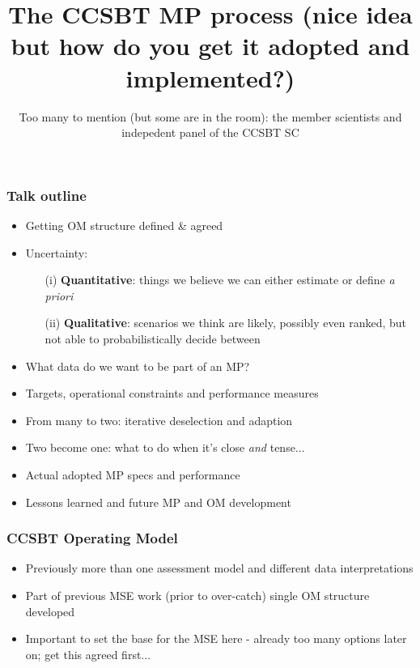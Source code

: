 \documentclass{beamer}
\title{The CCSBT MP process (nice idea but how do you get it adopted and implemented?)}
\author{Too many to mention (but some are in the room): the member scientists and indepedent panel of the CCSBT SC}
\begin{document}
\maketitle
\begin{frame}
\frametitle{Talk outline}
\begin{itemize}
    \item Getting OM structure defined \& agreed
    \item Uncertainty:
        \begin{enumerate}
            \item[(i)] \textbf{Quantitative}: things we believe we can either estimate or define \textit{a priori}
            \item[(ii)] \textbf{Qualitative}: scenarios we think are likely, possibly even ranked, but not able to probabilistically decide between
        \end{enumerate}
    \item What data do we want to be part of an MP?
    \item Targets, operational constraints and performance measures
    \item From many to two: iterative deselection and adaption
    \item Two become one: what to do when it's close \emph{and} tense...
    \item Actual adopted MP specs and performance
    \item Lessons learned and future MP and OM development
\end{itemize}
\end{frame}
\begin{frame}
\frametitle{CCSBT Operating Model}
\begin{itemize}
\item Previously more than one assessment model and different data interpretations
\item Part of previous MSE work (prior to over-catch) single OM structure developed
\item Important to set the base for the MSE here - already too many options later on; get this agreed first...
\end{itemize}
\end{frame}
\end{document}
